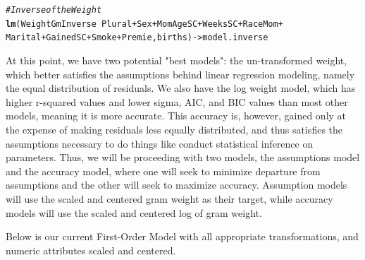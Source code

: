 \documentclass{article}\usepackage[]{graphicx}\usepackage[]{xcolor}
\makeatletter
\newcommand{\hlcom}[1]{\textcolor[rgb]{0.678,0.584,0.686}{\textit{#1}}}%
\newcommand{\hlopt}[1]{\textcolor[rgb]{0,0,0}{#1}}%
\newcommand{\hlstd}[1]{\textcolor[rgb]{0.345,0.345,0.345}{#1}}%
\newcommand{\hlkwb}[1]{\textcolor[rgb]{0.69,0.353,0.396}{#1}}%
\newcommand{\hlkwd}[1]{\textcolor[rgb]{0.737,0.353,0.396}{\textbf{#1}}}%
\newenvironment{kframe}{%
 \def\at@end@of@kframe{}%
 \ifinner\ifhmode%
  \def\at@end@of@kframe{\end{minipage}}%
  \begin{minipage}{\columnwidth}%
 \fi\fi%
 \def\FrameCommand##1{\hskip\@totalleftmargin \hskip-\fboxsep
 \colorbox{shadecolor}{##1}\hskip-\fboxsep
     \hskip-\linewidth \hskip-\@totalleftmargin \hskip\columnwidth}%
 \MakeFramed {\advance\hsize-\width
   \@totalleftmargin\z@ \linewidth\hsize
   \@setminipage}}%
 {\par\unskip\endMakeFramed%
 \at@end@of@kframe}
\newenvironment{knitrout}{}{} %
\makeatother
\begin{document}
\begin{knitrout}
\begin{kframe}
\begin{alltt}
\hlcom{# Inverse of the Weight}
\hlkwd{lm}\hlstd{(WeightGmInverse} \hlopt{~} \hlstd{Plural} \hlopt{+} \hlstd{Sex} \hlopt{+} \hlstd{MomAgeSC} \hlopt{+} \hlstd{WeeksSC} \hlopt{+} \hlstd{RaceMom} \hlopt{+}
     \hlstd{Marital} \hlopt{+} \hlstd{GainedSC} \hlopt{+} \hlstd{Smoke} \hlopt{+} \hlstd{Premie, births)} \hlkwb{->} \hlstd{model.inverse}
\end{alltt}
\end{kframe}
\end{knitrout}

At this point, we have two potential "best models": the un-transformed weight, which
better satisfies the assumptions behind linear regression modeling, namely the equal
distribution of residuals. We also have the log weight model, which has higher r-squared values and lower sigma, AIC, and BIC values than most other models, meaning it is more accurate. This accuracy is, however, gained only at the expense of making residuals less equally distributed, and thus satisfies the assumptions necessary to do things like conduct statistical inference on parameters. Thus, we will be proceeding with two models, the assumptions model and the accuracy model, where one will seek to minimize departure from assumptions and the other will seek to maximize accuracy. Assumption models will use the scaled and centered gram weight as their target, while accuracy models will use the scaled and centered log of gram weight.

Below is our current First-Order Model with all appropriate transformations, and numeric attributes scaled and centered.
\end{document}
